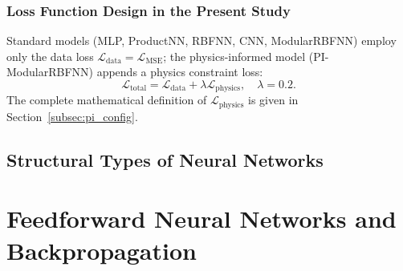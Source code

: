 \documentclass[a4paper,12pt]{report}
\newcommand{\Ldata}{\mathcal{L}_{\text{data}}}
\newcommand{\Lphys}{\mathcal{L}_{\text{physics}}}
\newcommand{\Ltotal}{\mathcal{L}_{\text{total}}}
\newcommand{\Lmse}{\mathcal{L}_{\text{MSE}}}
\begin{document}
\begin{CJK}{UTF8}{gbsn}
\subsection{Loss Function Design in the Present Study}
\label{subsec:loss_design}

Standard models (MLP, ProductNN, RBFNN, CNN, ModularRBFNN) employ only the data loss
$\Ldata = \Lmse$; the physics-informed model (PI-ModularRBFNN) appends a physics
constraint loss:
\begin{equation}
  \Ltotal = \Ldata + \lambda \Lphys, \quad \lambda = 0.2.
  \label{eq:total_loss}
\end{equation}
The complete mathematical definition of $\Lphys$ is given in Section~\ref{subsec:pi_config}.

\section{Structural Types of Neural Networks}
\label{sec:nn_types}

\begin{table}[H]
  \centering
  \caption{Neural network structural types and corresponding models in the present study}
  \label{tab:nn_types}
\end{table}

\chapter{Feedforward Neural Networks and Backpropagation}
\label{chap:ffnn}


\end{CJK}
\end{document}
